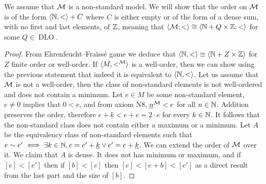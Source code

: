 \subquestion{}
We assume that $\mathcal{M}$ is a non-standard model.
We will show that the order on $\mathcal{M}$ is of the form $\langle \mathbb{N}, < \rangle + C$ where $C$ is either empty or of the form of a dense sum, with no first and last elements, of $\mathbb{Z}$,
meaning that $\langle \mathcal{M}; < \rangle \cong \langle \mathbb{N} + Q \times \mathbb{Z}; < \rangle$ for some $Q \in \operatorname{DLO}$.
\begin{proof}
	From Ehrenfeucht–Fraïssé game we deduce that $\langle \mathbb{N}, < \rangle \equiv \langle \mathbb{N} + Z \times \mathbb{Z} \rangle$ for $Z$ finite order or well-order.
	If $\langle M, <^{\mathcal{M}} \rangle$ is a well-order, then we can show using the previous statement that indeed it is equivalent to $\langle \mathbb{N}, < \rangle$.
	Let us assume that $\mathcal{M}$ is not a well-order, then the class of non-standard elements is not well-ordered and does not contain a minimum.
	Let $e \in M$ be some non-standard element,
	$e \ne 0$ implies that $0 < e$, and from axiom N8, $\underline{n}^{\mathcal{M}} < e$ for all $n \in \mathbb{N}$.
	Addition preserves the order, therefore $e + \underline{k} < e + e = 2 \cdot e$ for every $k \in \mathbb{N}$.
	It follows that the non-standard class does not contain either a maximum or a minimum.
	Let $A$ be the equivalency class of non-standard elements such that $e \sim e' \iff \exists k \in \mathbb{N}, e = e' + \underline{k} \lor e' = e + \underline{k}$.
	We can extend the order of $\mathcal{M}$ over it. We claim that $A$ is dense.
	It does not has minimum or maximum, and if $[e] < [e']$ then if $[b] < [e]$ then $[e] < [e + b] < [e']$ as a direct result from the last part and the size of $[b]$.
\end{proof}


